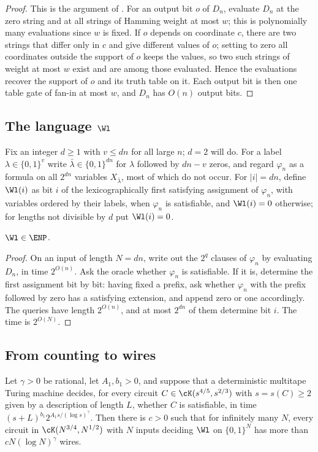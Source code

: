 \begin{proof}
This is the argument of \cite[Appendix C.1]{OAI26}. For an output bit $o$ of
$D_n$, evaluate $D_n$ at the zero string and at all strings of Hamming weight
at most $w$; this is polynomially many evaluations since $w$ is fixed. If $o$
depends on coordinate $c$, there are two strings that differ only in $c$ and
give different values of $o$; setting to zero all coordinates outside the
support of $o$ keeps the values, so two such strings of weight at most $w$
exist and are among those evaluated. Hence the evaluations recover the support
of $o$ and its truth table on it. Each output bit is then one table gate of
fan-in at most $w$, and $D_n$ has $O(n)$ output bits.
\end{proof}

\subsection{The language $\Wl$}
Fix an integer $d\ge1$ with $v\le dn$ for all large $n$; $d=2$ will do. For a
label $\lambda\in\{0,1\}^v$ write $\bar\lambda\in\{0,1\}^{dn}$ for $\lambda$
followed by $dn-v$ zeros, and regard $\varphi_n$ as a formula on all $2^{dn}$
variables $X_{\bar\lambda}$, most of which do not occur. For $|i|=dn$, define
$\Wl(i)$ as bit $i$ of the lexicographically first satisfying assignment of
$\varphi_n$, with variables ordered by their labels, when $\varphi_n$ is
satisfiable, and $\Wl(i)=0$ otherwise; for lengths not divisible by $d$ put
$\Wl(i)=0$.

\begin{lemma}\label{lem:WinENP}
$\Wl\in\ENP$.
\end{lemma}

\begin{proof}
On an input of length $N=dn$, write out the $2^q$ clauses of $\varphi_n$ by
evaluating $D_n$, in time $2^{O(n)}$. Ask the oracle whether $\varphi_n$ is
satisfiable. If it is, determine the first assignment bit by bit: having fixed
a prefix, ask whether $\varphi_n$ with the prefix followed by zero has a
satisfying extension, and append zero or one accordingly. The queries have
length $2^{O(n)}$, and at most $2^{dn}$ of them determine bit $i$. The time is
$2^{O(N)}$.
\end{proof}

\subsection{From counting to wires}
\begin{theorem}\label{thm:transfer}
Let $\gamma>0$ be rational, let $A_1,b_1>0$, and suppose that a deterministic multitape Turing
machine decides, for every circuit $C\in\cK(s^{4/5},s^{2/3})$ with $s=s(C)\ge2$
given by a description of length $L$, whether $C$ is satisfiable, in time
$(s+L)^{b_1}2^{A_1s/(\log s)^\gamma}$. Then there is $c>0$ such that for infinitely
many $N$, every circuit in $\cK(N^{3/4},N^{1/2})$ with $N$ inputs deciding $\Wl$ on
$\{0,1\}^N$ has more than $cN(\log N)^\gamma$ wires.
\end{theorem}

